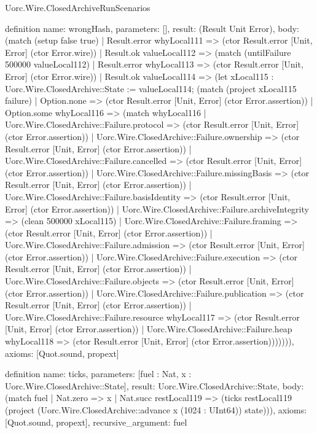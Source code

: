 \begin{lexlean}{Uorc.Wire.ClosedArchiveRunScenarios}
\begin{semanticmodule}
definition{
  name: wrongHash,
  parameters: [],
  result: (Result Unit Error),
  body: (match (setup false true)
    | Result.error whyLocal111 => (ctor Result.error [Unit, Error] (ctor Error.wire))
    | Result.ok valueLocal112 => (match (untilFailure 500000 valueLocal112)
      | Result.error whyLocal113 => (ctor Result.error [Unit, Error] (ctor Error.wire))
      | Result.ok valueLocal114 => (let xLocal115 : Uorc.Wire.ClosedArchive::State := valueLocal114; (match (project xLocal115 failure)
        | Option.none => (ctor Result.error [Unit, Error] (ctor Error.assertion))
        | Option.some whyLocal116 => (match whyLocal116
          | Uorc.Wire.ClosedArchive::Failure.protocol => (ctor Result.error [Unit, Error] (ctor Error.assertion))
          | Uorc.Wire.ClosedArchive::Failure.ownership => (ctor Result.error [Unit, Error] (ctor Error.assertion))
          | Uorc.Wire.ClosedArchive::Failure.cancelled => (ctor Result.error [Unit, Error] (ctor Error.assertion))
          | Uorc.Wire.ClosedArchive::Failure.missingBasis => (ctor Result.error [Unit, Error] (ctor Error.assertion))
          | Uorc.Wire.ClosedArchive::Failure.basisIdentity => (ctor Result.error [Unit, Error] (ctor Error.assertion))
          | Uorc.Wire.ClosedArchive::Failure.archiveIntegrity => (clean 500000 xLocal115)
          | Uorc.Wire.ClosedArchive::Failure.framing => (ctor Result.error [Unit, Error] (ctor Error.assertion))
          | Uorc.Wire.ClosedArchive::Failure.admission => (ctor Result.error [Unit, Error] (ctor Error.assertion))
          | Uorc.Wire.ClosedArchive::Failure.execution => (ctor Result.error [Unit, Error] (ctor Error.assertion))
          | Uorc.Wire.ClosedArchive::Failure.objects => (ctor Result.error [Unit, Error] (ctor Error.assertion))
          | Uorc.Wire.ClosedArchive::Failure.publication => (ctor Result.error [Unit, Error] (ctor Error.assertion))
          | Uorc.Wire.ClosedArchive::Failure.resource whyLocal117 => (ctor Result.error [Unit, Error] (ctor Error.assertion))
          | Uorc.Wire.ClosedArchive::Failure.heap whyLocal118 => (ctor Result.error [Unit, Error] (ctor Error.assertion))))))),
  axioms: [Quot.sound, propext]
}

definition{
  name: ticks,
  parameters: [fuel : Nat, x : Uorc.Wire.ClosedArchive::State],
  result: Uorc.Wire.ClosedArchive::State,
  body: (match fuel
    | Nat.zero => x
    | Nat.succ restLocal119 => (ticks restLocal119 (project (Uorc.Wire.ClosedArchive::advance x (1024 : UInt64)) state))),
  axioms: [Quot.sound, propext],
  recursive_argument: fuel
}


\end{semanticmodule}
\end{lexlean}
